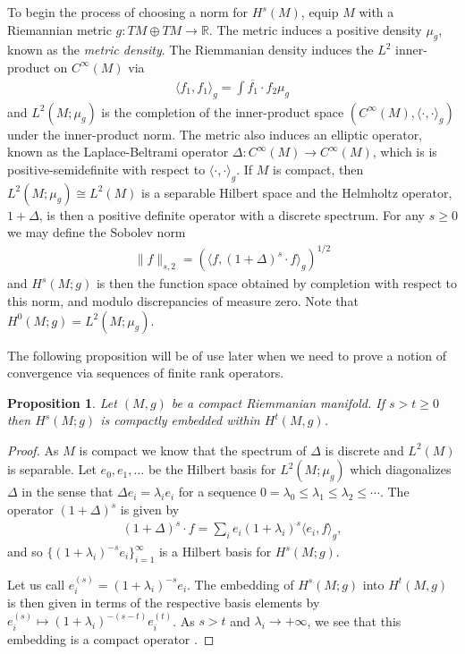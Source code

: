 \documentclass[12pt]{amsart}
\newtheorem{prop}[thm]{Proposition}
\begin{document}
To begin the process of choosing a norm for $H^{s}(M)$, equip $M$ with a Riemannian metric $g:TM \oplus TM \to \mathbb{R}$.
The metric induces a positive density $\mu_g$,
known as the \emph{metric density}. 
The Riemmanian density induces the $L^2$ inner-product on $C^\infty(M)$ via
\begin{align}
	\langle f_1 , f_1 \rangle_{g} = \int \overline{f_1} \cdot f_2 \mu_g
\end{align}
and $L^{2}(M;\mu_{g})$ is the completion of the inner-product space $( C^{\infty}(M) , \langle \cdot , \cdot \rangle_{g})$ under 
the inner-product norm.
The metric also induces an elliptic operator, known as the Laplace-Beltrami operator $\Delta: C^{\infty}(M) \to C^{\infty}(M)$, which is is positive-semidefinite
with respect to $\langle \cdot , \cdot \rangle_{g}$.
If $M$ is compact, then $L^2(M ; \mu_g) \cong L^2(M)$ is a separable Hilbert space
and the Helmholtz operator, $1 + \Delta$, is then a positive definite operator
with a discrete spectrum.
For any $s \geq 0$ we may define the Sobolev norm
\begin{align}
	\| f \|_{s,2} =  \left( \langle f , (1+\Delta)^s \cdot f \rangle_{g} \right)^{1/2}
\end{align}
and $H^s(M ; g)$ is then the function space obtained by completion with respect to this norm, and modulo discrepancies of measure zero.
Note that $H^0(M;g) = L^2(M;\mu_g)$.

The following proposition will be of use later when we need to prove a notion of convergence
via sequences of finite rank operators.

\begin{prop} \label{prop:compact_embedding}
	Let $(M,g)$ be a compact Riemmanian manifold.  If $s > t \geq 0$ then $H^s(M;g)$ is compactly embedded within $H^t(M,g)$.
\end{prop}
\begin{proof}
	As $M$ is compact we know that the spectrum of $\Delta$ is discrete and $L^{2}(M)$ is separable.
	Let $e_0, e_1,\dots$ be the Hilbert basis for $L^2(M;\mu_g)$ which diagonalizes $\Delta$
	in the sense that $\Delta e_i = \lambda_i e_i$ for a sequence $0 = \lambda_0 \leq \lambda_1 \leq \lambda_2 \leq \cdots$.
	The operator $(1+\Delta)^s$ is given by
	\begin{align}
		(1+\Delta)^s \cdot f =  \sum_{i} e_i (1+\lambda_i)^s \langle e_i , f \rangle_g,
	\end{align}
	and so $\{ (1+ \lambda_i)^{-s} e_i \}_{i=1}^{\infty}$ is a Hilbert basis for $H^s(M;g)$.
	
	Let us call $e_i^{(s)} = (1+ \lambda_i)^{-s} e_i$.
	The embedding of $H^s(M;g)$ into $H^t(M,g)$
	is then given in terms of the respective basis elements by $e_i^{(s)} \mapsto (1+\lambda_i)^{-(s-t)}e_i^{(t)}$.
	As $s > t$ and $\lambda_i \to +\infty$, we see that 
	this embedding is a compact operator \cite[see Proposition 4.6]{Conway1990}.
\end{proof}
\end{document}
